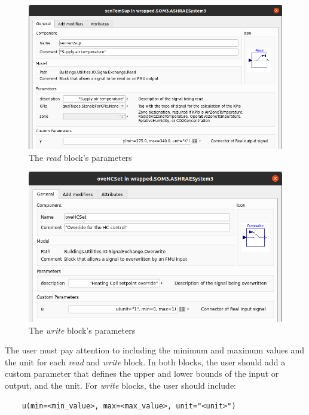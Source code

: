 \documentclass{article}
\begin{document}
\begin{figure}
    \centering
    \includegraphics[width=400pt]{Figures/readblock.png}
    \caption{The \textit{read} block's parameters}
    \label{fig:sigex-read}
\end{figure}

\begin{figure}
    \centering
    \includegraphics[width=400pt]{Figures/write_block.png}
    \caption{The \textit{write} block's parameters}
    \label{fig:sigex-write}
\end{figure}

The user must pay attention to including the minimum and maximum values and the unit for each \textit{read} and \textit{write} block. In both blocks, the user should add a custom parameter that defines the upper and lower bounds of the input or output, and the unit. For \textit{write} blocks, the user should include:
\begin{verbatim}
    u(min=<min_value>, max=<max_value>, unit="<unit>")
\end{verbatim}
\end{document}
